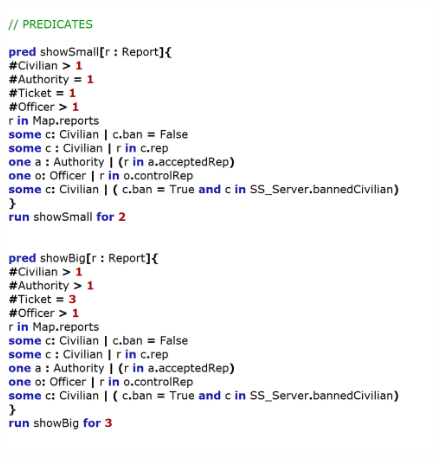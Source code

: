 \documentclass[12pt,a4paper]{article}
\begin{document}
\begin{figure}[H]
\begin{adjustwidth}{-25mm}{-25mm}
				\centering
				\includegraphics[width=.8\paperwidth,height=.8\paperheight, keepaspectratio]{Images/Alloy/preds}
\end{adjustwidth}
\end{figure}
\end{document}
